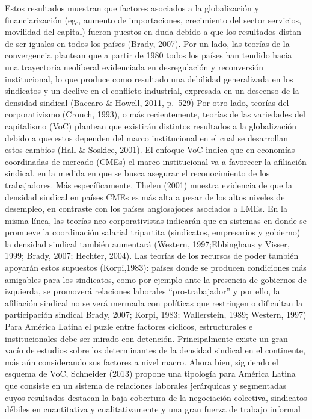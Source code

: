 \documentclass[
]{book}
\begin{document}
Estos resultados muestran que factores asociados a la globalización y financiarización (eg., aumento de importaciones, crecimiento del sector servicios, movilidad del capital) fueron puestos en duda debido a que los resultados distan de ser iguales en todos los países (Brady, 2007). Por un lado, las teorías de la convergencia plantean que a partir de 1980 todos los países han tendido hacia una trayectoria neoliberal evidenciada en desregulación y reconversión institucional, lo que produce como resultado una debilidad generalizada en los sindicatos y un declive en el conflicto industrial, expresada en un descenso de la densidad sindical (Baccaro \& Howell, 2011, p.~529)
Por otro lado, teorías del corporativismo (Crouch, 1993), o más recientemente, teorías de las variedades del capitalismo (VoC) plantean que existirán distintos resultados a la globalización debido a que estos dependen del marco institucional en el cual se desarrollan estos cambios (Hall \& Soskice, 2001). El enfoque VoC indica que en economías coordinadas de mercado (CMEs) el marco institucional va a favorecer la afiliación sindical, en la medida en que se busca asegurar el reconocimiento de los trabajadores. Más específicamente, Thelen (2001) muestra evidencia de que la densidad sindical en países CMEs es más alta a pesar de los altos niveles de desempleo, en contraste con los países anglosajones asociados a LMEs.
En la misma línea, las teorías neo-corporativistas indicarán que en sistemas en donde se promueve la coordinación salarial tripartita (sindicatos, empresarios y gobierno) la densidad sindical también aumentará (Western, 1997;Ebbinghaus y Visser, 1999; Brady, 2007; Hechter, 2004). Las teorías de los recursos de poder también apoyarán estos supuestos (Korpi,1983): países donde se producen condiciones más amigables para los sindicatos, como por ejemplo ante la presencia de gobiernos de izquierda, se promoverá relaciones laborales ``pro-trabajador'' y por ello, la afiliación sindical no se verá mermada con políticas que restringen o dificultan la participación sindical Brady, 2007; Korpi, 1983; Wallerstein, 1989; Western, 1997)
Para América Latina el puzle entre factores cíclicos, estructurales e institucionales debe ser mirado con detención. Principalmente existe un gran vacío de estudios sobre los determinantes de la densidad sindical en el continente, más aún considerando sus factores a nivel macro. Ahora bien, siguiendo el esquema de VoC, Schneider (2013) propone una tipología para América Latina que consiste en un sistema de relaciones laborales jerárquicas y segmentadas cuyos resultados destacan la baja cobertura de la negociación colectiva, sindicatos débiles en cuantitativa y cualitativamente y una gran fuerza de trabajo informal
\end{document}
